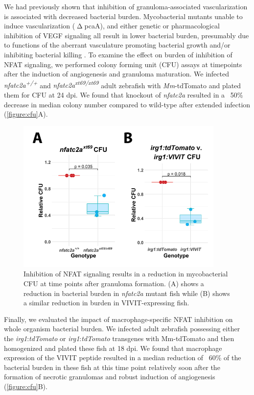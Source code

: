 We had previously shown that inhibition of granuloma-associated vascularization is associated with decreased bacterial burden. Mycobacterial mutants unable to induce vascularization ($\upDelta$pcaA), and either genetic or pharmacological inhibition of VEGF signaling all result in lower bacterial burden, presumably due to functions of the aberrant vasculature promoting bacterial growth and/or inhibiting bacterial killing \citep{Rao2005, Glickman2000, Oehlers2015, Walton2018}. To examine the effect on burden of inhibition of NFAT signaling, we performed colony forming unit (CFU) assays at timepoints after the induction of angiogenesis and granuloma maturation. We infected \textit{nfatc2a\textsuperscript{+/+}} and \textit{nfatc2a\textsuperscript{xt69/xt69}} adult zebrafish with \textit{Mm}-tdTomato and plated them for CFU at 24 dpi. We found that knockout of \textit{nfatc2a} resulted in a ~50\% decrease in median colony number compared to wild-type after extended infection (\autoref{figure:cfu}A). 

\begin{figure}
\centering
\includegraphics[height=3in]{images/cfu.pdf}
\caption{Inhibition of NFAT signaling results in a reduction in mycobacterial CFU at time points after granuloma formation. (A) shows a reduction in bacterial burden in \textit{nfatc2a} mutant fish while (B) shows a similar reduction in burden in VIVIT-expressing fish.}
\label{figure:cfu}

\end{figure}

Finally, we evaluated the impact of macrophage-specific NFAT inhibition on whole organism bacterial burden. We infected adult zebrafish possessing either the \textit{irg1}:\textit{tdTomato} or \textit{irg1}:\textit{tdTomato} transgenes with Mm-tdTomato and then homogenized and plated these fish at 18 dpi. We found that macrophage expression of the VIVIT peptide resulted in a median reduction of ~60\% of the bacterial burden in these fish at this time point relatively soon after the formation of necrotic granulomas and robust induction of angiogenesis (\autoref{figure:cfu}B).
 

